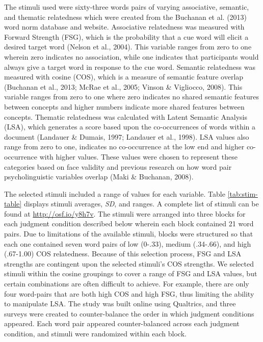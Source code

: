 \documentclass[english,,man]{apa6}
\begin{document}
The stimuli used were sixty-three words pairs of varying associative,
semantic, and thematic relatedness which were created from the Buchanan
et al. (2013) word norm database and website. Associative relatedness
was measured with Forward Strength (FSG), which is the probability that
a cue word will elicit a desired target word (Nelson et al., 2004). This
variable ranges from zero to one wherein zero indicates no association,
while one indicates that participants would always give a target word in
response to the cue word. Semantic relatedness was measured with cosine
(COS), which is a measure of semantic feature overlap (Buchanan et al.,
2013; McRae et al., 2005; Vinson \& Vigliocco, 2008). This variable
ranges from zero to one where zero indicates no shared semantic features
between concepts and higher numbers indicate more shared features
between concepts. Thematic relatedness was calculated with Latent
Semantic Analysis (LSA), which generates a score based upon the
co-occurrences of words within a document (Landauer \& Dumais, 1997;
Landauer et al., 1998). LSA values also range from zero to one,
indicates no co-occurrence at the low end and higher co-occurrence with
higher values. These values were chosen to represent these categories
based on face validity and previous research on how word pair
psycholinguistic variables overlap (Maki \& Buchanan, 2008).

The selected stimuli included a range of values for each variable. Table
\ref{tab:stim-table} displays stimuli averages, \emph{SD}, and ranges. A
complete list of stimuli can be found at \url{http://osf.io/y8h7v}. The
stimuli were arranged into three blocks for each judgment condition
described below wherein each block contained 21 word pairs. Due to
limitations of the available stimuli, blocks were structured so that
each one contained seven word pairs of low (0-.33), medium (.34-.66),
and high (.67-1.00) COS relatedness. Because of this selection process,
FSG and LSA strengths are contingent upon the selected stimuli's COS
strengths. We selected stimuli within the cosine groupings to cover a
range of FSG and LSA values, but certain combinations are often
difficult to achieve. For example, there are only four word-pairs that
are both high COS and high FSG, thus limiting the ability to manipulate
LSA. The study was built online using Qualtrics, and three surveys were
created to counter-balance the order in which judgment conditions
appeared. Each word pair appeared counter-balanced across each judgment
condition, and stimuli were randomized within each block.
\end{document}
